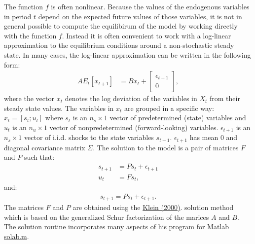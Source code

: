 \documentclass[letterpaper,10pt,openany,oneside,english]{sphinxmanual}
\begin{document}
The function \(f\) is often nonlinear. Because the values of the endogenous variables in period \(t\) depend on the expected future values of those variables, it is not in general possible to compute the equilibirum of the model by working directly with the function \(f\). Instead it is often convenient to work with a log-linear approximation to the equilibrium conditions around a non-stochastic steady state. In many cases, the log-linear approximation can be written in the following form:
\label{\detokenize{howLinearsolveWorks:equation-howLinearsolveWorks:1}}\begin{equation}\label{equation:howLinearsolveWorks:howLinearsolveWorks:1}
\begin{split}A E_t\left[ x_{t+1} \right] & = B x_t + \left[ \begin{array}{c} \epsilon_{t+1} \\ 0 \end{array} \right],\end{split}
\end{equation}
where the vector \(x_{t}\) denotes the log deviation of the variables in \(X_t\) from their steady state values. The variables in \(x_t\) are grouped in a specific way: \(x_t = [s_t; u_t]\) where \(s_t\) is an \(n_s \times 1\) vector of predetermined (state) variables and \(u_t\) is an \(n_u \times 1\) vector of nonpredetermined (forward-looking) variables. \(\epsilon_{t+1}\) is an \(n_s\times 1\) vector of i.i.d. shocks to the state variables \(s_{t+1}\).  \(\epsilon_{t+1}\) has mean 0 and diagonal covariance matrix \(\Sigma\). The solution to the model is a pair of matrices \(F\) and \(P\) such that:
\label{\detokenize{howLinearsolveWorks:equation-howLinearsolveWorks:2}}\begin{equation}\label{equation:howLinearsolveWorks:howLinearsolveWorks:2}
\begin{split}s_{t+1} &= Ps_t + \epsilon_{t+1}\\
u_t &= Fs_t,\end{split}
\end{equation}
and:
\label{\detokenize{howLinearsolveWorks:equation-howLinearsolveWorks:3}}\begin{equation}\label{equation:howLinearsolveWorks:howLinearsolveWorks:3}
\begin{split}s_{t+1} = Ps_t + \epsilon_{t+1}.\end{split}
\end{equation}
The matrices \(F\) and \(P\) are obtained using the \href{http://www.sciencedirect.com/science/article/pii/S0165188999000457}{Klein (2000)}. solution method which is based on the generalized Schur factorization of the marices \(A\) and \(B\). The solution routine incorporates many aspects of his program for Matlab \href{http://paulklein.ca/newsite/codes/codes.php}{solab.m}.
\end{document}
